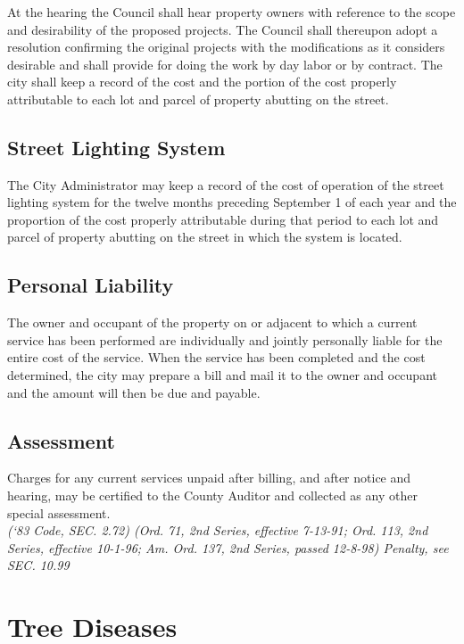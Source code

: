 \subsubsection{}
At the hearing the Council shall hear property owners with reference to the scope and desirability of the proposed projects.  The Council shall thereupon adopt a resolution confirming the original projects with the modifications as it considers desirable and shall provide for doing the work by day labor or by contract.  The city shall keep a record of the cost and the portion of the cost properly attributable to each lot and parcel of property abutting on the street.
\subsection{Street Lighting System}
The City Administrator may keep a record of the cost of operation of the street lighting system for the twelve months preceding September 1 of each year and the proportion of the cost properly attributable during that period to each lot and parcel of property abutting on the street in which the system is located.
\subsection{Personal Liability}
The owner and occupant of the property on or adjacent to which a current service has been performed are individually and jointly personally liable for the entire cost of the service.  When the service has been completed and the cost determined, the city may prepare a bill and mail it to the owner and occupant and the amount will then be due and payable.
\subsection{Assessment}
Charges for any current services unpaid after billing, and after notice and hearing, may be certified to the County Auditor and collected as any other special assessment.\\
\emph{(‘83 Code, SEC. 2.72)  (Ord. 71, 2nd Series, effective 7-13-91; Ord. 113, 2nd Series, effective 10-1-96; Am. Ord. 137, 2nd Series, passed 12-8-98)  Penalty, see SEC. 10.99}

\section{Tree Diseases}
